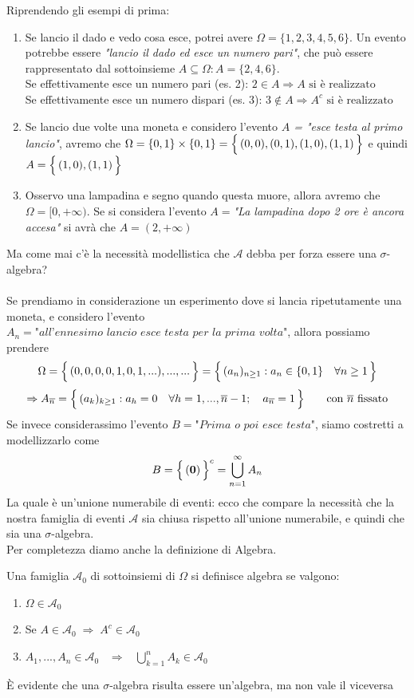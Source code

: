 \begin{esempio}
    Riprendendo gli esempi di prima:
    \begin{enumerate}
        \item Se lancio il dado e vedo cosa esce, potrei avere $\Omega = \{1, 2, 3, 4, 5, 6\}$. Un evento potrebbe essere \textit{"lancio il dado ed esce un numero pari"}, che può essere rappresentato dal sottoinsieme $A \subseteq \Omega: A = \{2, 4, 6\}$.\\
        Se effettivamente esce un numero pari (es. 2): $2\in A \Rightarrow A \text{ si è realizzato}$\\
        Se effettivamente esce un numero dispari (es. 3): $3\notin A \Rightarrow A^c \text{ si è realizzato}$
        \item Se lancio due volte una moneta e considero l'evento \textit{$A$ = "esce testa al primo lancio"}, avremo che $\Omega = \{0, 1\} \times\{0, 1\} = \Bigl\{\,(0,0), (0,1), (1, 0), (1, 1)\,\Bigr\}$ e quindi $A = \Bigl\{\,(1, 0), (1, 1)\,\Bigr\}$
        \item Osservo una lampadina e segno quando questa muore, allora avremo che $\Omega = [0, +\infty)$. Se si considera l'evento \textit{$A = $"La lampadina dopo 2 ore è ancora accesa"} si avrà che $A = (2, +\infty)$
    \end{enumerate}
\end{esempio}
\bigskip
\noindent Ma come mai c'è la necessità modellistica che $\mathcal{A}$ debba per forza essere una $\sigma$-algebra?\\
\\
Se prendiamo in considerazione un esperimento dove si lancia ripetutamente una moneta, e considero l'evento
\(A_n = \textit{"all'ennesimo lancio esce testa per la prima volta"}\), allora possiamo prendere
\[\Omega = \Bigl\{\,(0, 0, 0,0, 1, 0, 1, ...), ...,...\,\Bigr\} = \Bigl\{\,(a_n)_{n\geq1}: a_n \in \{0, 1\} \quad \forall n\geq1\,\Bigr\}\]
\[\Rightarrow A_{\overline{n}} = \Bigl\{\,(a_k)_{k\geq1}: a_h = 0\quad \forall h = 1, ..., \overline{n}-1;\quad a_{\overline{n}}=1\,\Bigr\} \qquad \text{con } \overline{n} \text{ fissato}\]
Se invece considerassimo l'evento $B = \textit{"Prima o poi esce testa"}$, siamo costretti a modellizzarlo come
\[B = \Bigl\{\,(\mathbf{0})\,\Bigr\}^c = \bigcup_{n=1}^\infty A_n\]
La quale è un'unione numerabile di eventi: ecco che compare la necessità che la nostra famiglia di eventi $\mathcal{A}$ sia chiusa rispetto all'unione numerabile, e quindi che sia una $\sigma$-algebra.\\
Per completezza diamo anche la definizione di Algebra.
\begin{definizione}
     Una famiglia $\mathcal{A}_0$ di sottoinsiemi di $\Omega$ si definisce algebra se valgono:
    \begin{enumerate}
        \item $\Omega \in \mathcal{A}_0$ 
    \item Se $A \in \mathcal{A}_0 \;\Rightarrow\; A^c \in \mathcal{A}_0$
    \item $A_1, ..., A_n \in \mathcal{A}_0\;\;\; \Rightarrow \;\;\; \bigcup_{k=1}^{n} A_k \in \mathcal{A}_0$
    \end{enumerate}
\end{definizione}
È evidente che una $\sigma$-algebra risulta essere un'algebra, ma non vale il viceversa

